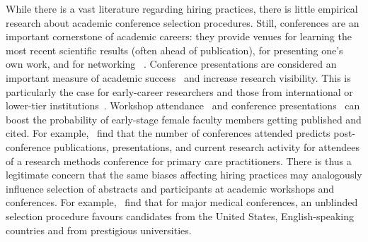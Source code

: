 \documentclass[12pt]{article}
\newcommand{\BMN}[1]{\textcolor{blue}{BM:~#1}\normalcolor{}}
\begin{document}
While there is a vast literature regarding hiring practices, there is little empirical research about academic conference selection procedures. Still, conferences are an important cornerstone of academic careers: they provide venues for learning the most recent scientific results (often ahead of publication), for presenting one's own work, and for networking ~\cite{nicolson2016}. Conference presentations are considered an important measure of academic success~\cite{Buddeberg-Fischer2008} and increase research visibility. This is particularly the case for early-career researchers and those from international or lower-tier institutions~\cite{leite2014}. Workshop attendance~\cite{blau2010} and conference presentations~\cite{housri2008} can boost the probability of early-stage female faculty members getting published and cited. For example,~\cite{katerndahl1999} find that the number of conferences attended predicts post-conference publications, presentations, and current research activity for attendees of a research methods conference for primary care practitioners. 
There is thus a legitimate concern that the same biases affecting hiring practices may analogously influence selection of abstracts and participants at academic workshops and conferences. For example,~\cite{ross2006} find that for major medical conferences, an unblinded selection procedure favours candidates from the United States, English-speaking countries and from prestigious universities. 



\end{document}
